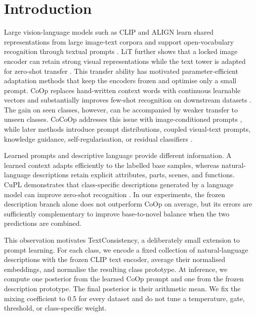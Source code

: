 \documentclass[preprint,12pt]{elsarticle}
\begin{document}
\section{Introduction}
\label{sec:introduction}

Large vision-language models such as CLIP and ALIGN learn shared representations from large image-text corpora and support open-vocabulary recognition through textual prompts \cite{radford2021clip,jia2021align}. LiT further shows that a locked image encoder can retain strong visual representations while the text tower is adapted for zero-shot transfer \cite{zhai2022lit}. This transfer ability has motivated parameter-efficient adaptation methods that keep the encoders frozen and optimise only a small prompt. CoOp replaces hand-written context words with continuous learnable vectors and substantially improves few-shot recognition on downstream datasets \cite{zhou2022coop}. The gain on seen classes, however, can be accompanied by weaker transfer to unseen classes. CoCoOp addresses this issue with image-conditioned prompts \cite{zhou2022cocoop}, while later methods introduce prompt distributions, coupled visual-text prompts, knowledge guidance, self-regularisation, or residual classifiers \cite{lu2022proda,khattak2023maple,yao2023kgcoop,khattak2023promptsrc,yu2023taskres}.

Learned prompts and descriptive language provide different information. A learned context adapts efficiently to the labelled base samples, whereas natural-language descriptions retain explicit attributes, parts, scenes, and functions. CuPL demonstrates that class-specific descriptions generated by a language model can improve zero-shot recognition \cite{pratt2023cupl}. In our experiments, the frozen description branch alone does not outperform CoOp on average, but its errors are sufficiently complementary to improve base-to-novel balance when the two predictions are combined.

This observation motivates TextConsistency, a deliberately small extension to prompt learning. For each class, we encode a fixed collection of natural-language descriptions with the frozen CLIP text encoder, average their normalised embeddings, and normalise the resulting class prototype. At inference, we compute one posterior from the learned CoOp prompt and one from the frozen description prototype. The final posterior is their arithmetic mean. We fix the mixing coefficient to 0.5 for every dataset and do not tune a temperature, gate, threshold, or class-specific weight.
\end{document}
